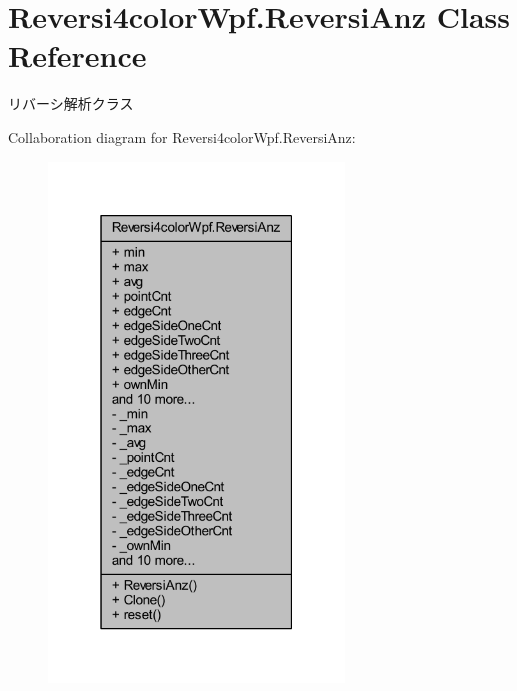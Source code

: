 \hypertarget{class_reversi4color_wpf_1_1_reversi_anz}{}\section{Reversi4color\+Wpf.\+Reversi\+Anz Class Reference}
\label{class_reversi4color_wpf_1_1_reversi_anz}


リバーシ解析クラス  




Collaboration diagram for Reversi4color\+Wpf.\+Reversi\+Anz\+:\nopagebreak
\begin{figure}[H]
\begin{center}
\leavevmode
\includegraphics[width=223pt]{class_reversi4color_wpf_1_1_reversi_anz__coll__graph}
\end{center}
\end{figure}
